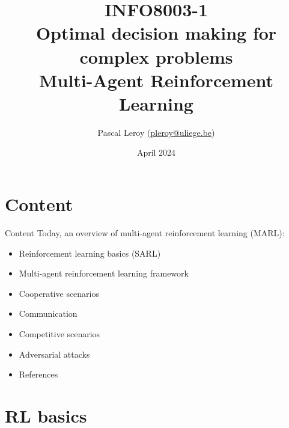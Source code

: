 \documentclass[9pt, hyperref={pdfusetitle,colorlinks=true,allcolors=DarkBlue}]{beamer}
\author{Pascal Leroy (\href{mailto:pleroy@uliege.be}{pleroy@uliege.be})}
\begin{document}
\title{
INFO8003-1 \\
Optimal decision making for complex problems
\\
\vspace{.7cm}
Multi-Agent Reinforcement Learning
}

\date{April 2024}
\maketitle


\section*{Content}
\begin{frame}{Content}
Today, an overview of multi-agent reinforcement learning (MARL):
\begin{itemize}
\vfill
\item Reinforcement learning basics (SARL)
\vfill
\item Multi-agent reinforcement learning framework
\vfill
\item Cooperative scenarios
\vfill
\item Communication
\vfill
\item Competitive scenarios
\vfill
\item Adversarial attacks
\vfill
\item References
\end{itemize}

\end{frame}

\section{RL basics}
\end{document}
